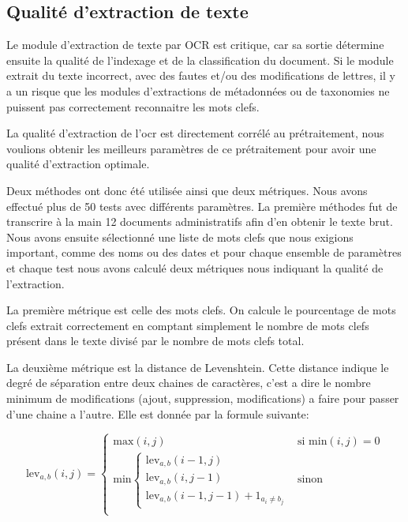 \subsection{Qualité d'extraction de texte}\label{testOCR}
Le module d'extraction de texte par OCR est critique, car sa sortie détermine ensuite la qualité de l'indexage et de la classification du document.
Si le module extrait du texte incorrect, avec des fautes et/ou des modifications de lettres, il y a un risque que les modules d'extractions de métadonnées ou de taxonomies ne puissent pas correctement reconnaitre les mots clefs. 

La qualité d'extraction de l'\gls{ocr} est directement corrélé au prétraitement, nous voulions obtenir les meilleurs paramètres de ce prétraitement pour avoir une qualité d'extraction optimale.

Deux méthodes ont donc été utilisée ainsi que deux métriques.
Nous avons effectué plus de 50 tests avec différents paramètres.
La première méthodes fut de transcrire à la main 12 documents administratifs afin d'en obtenir le texte brut.
Nous avons ensuite sélectionné une liste de mots clefs que nous exigions important, comme des noms ou des dates et pour chaque ensemble de paramètres et chaque test nous avons calculé deux métriques nous indiquant la qualité de l'extraction.

La première métrique est celle des mots clefs.
On calcule le pourcentage de mots clefs extrait correctement en comptant simplement le nombre de mots clefs présent dans le texte divisé par le nombre de mots clefs total. 

La deuxième métrique est la distance de Levenshtein.
Cette distance indique le degré de séparation entre deux chaines de caractères, c'est a dire le nombre minimum de modifications (ajout, suppression, modifications) a faire pour passer d'une chaine a l'autre. Elle est donnée par la formule suivante:

\begin{equation}
	\text{lev}_{a,b}(i,j) = \left\{\begin{matrix}
		\text{max}(i,j) & \text{si min}(i,j) = 0 \\ 
		\text{min}\left\{\begin{matrix}
			\text{lev}_{a,b}(i-1,j)\\ 
			\text{lev}_{a,b}(i,j-1)\\ 
			\text{lev}_{a,b}(i-1,j-1)+1_{a_i \neq b_j}
		\end{matrix}\right. & \text{sinon} \\ 
	\end{matrix}\right.
\end{equation}


